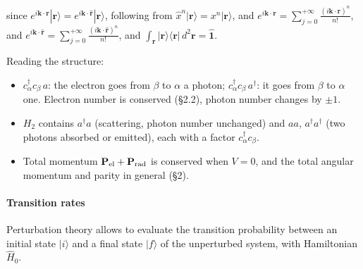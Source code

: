\documentclass[letterpaper,10pt,english]{jupyterBook}
\begin{document}
\sphinxAtStartPar
since \(e^{i \mathbf{k} \cdot \mathbf{r}} | \mathbf{r} \rangle = e^{i \mathbf{k} \cdot \hat{\mathbf{r}}} | \mathbf{r} \rangle\), following from \(\hat{x}^n | \mathbf{r} \rangle = x^n | \mathbf{r} \rangle\), and \(e^{i \mathbf{k} \cdot \mathbf{r}} = \sum_{j=0}^{+\infty} \frac{(i \mathbf{k} \cdot \mathbf{r})^n}{n!}\), and \(e^{i \mathbf{k} \cdot \hat{\mathbf{r}}} = \sum_{j=0}^{+\infty} \frac{(i \mathbf{k} \cdot \hat{\mathbf{r}})^n}{n!}\), and \(\int_{\mathbf{r}} | \mathbf{r} \rangle \langle \mathbf{r} | \, d^2 \mathbf{r} = \hat{\mathbf{1}}\).

\sphinxAtStartPar
Reading the structure:
\begin{itemize}
\item {} 
\sphinxAtStartPar
\(c^\dagger_\alpha c_\beta\,a\): the electron goes from \(\beta\) to \(\alpha\)  a photon; \(c^\dagger_\alpha c_\beta\,a^\dagger\): it goes from \(\beta\) to \(\alpha\)  one. Electron number is conserved (§2.2), photon number changes by \(\pm1\).

\item {} 
\sphinxAtStartPar
\(H_2\) contains \(a^\dagger a\) (scattering, photon number unchanged) and \(aa\), \(a^\dagger a^\dagger\) (two photons absorbed or emitted), each with a factor \(c^\dagger_\alpha c_\beta\).

\item {} 
\sphinxAtStartPar
Total momentum \(\mathbf P_{\rm el}+\mathbf P_{\rm rad}\) is conserved when \(V=0\), and the total angular momentum and parity in general (§2).

\end{itemize}


\paragraph{Transition rates}
\label{\detokenize{ch/quantum-mechanics/qft/interactions-e-em-fields-atom-spectrum:transition-rates}}


\sphinxAtStartPar
Perturbation theory allows to evaluate the transition probability between an initial state \(| i \rangle\) and a final state \(| f \rangle\) of the unperturbed system, with Hamiltonian \(\hat{H}_0\).
\end{document}

